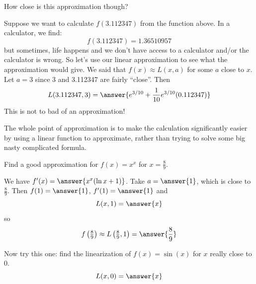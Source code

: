 \documentclass{ximera}
\begin{document}
How close is this approximation though?

\begin{example}\label{example:8-10}
Suppose we want to calculate $f(3.112347)$ from the function above. In a calculator, we find:
\[
f(3.112347)=1.36510957
\]
but sometimes, life happens and we don't have access to a calculator and/or the calculator is wrong. So let's use our linear approximation to see what the approximation would give. We said that $f(x) \approx L(x, a)$ for some $a$ close to $x$. Let $a=3$ since 3 and 3.112347 are fairly ``close''. Then
\[
L(3.112347,3)=\answer{e^{3/10}+\frac{1}{10}e^{3/10}(0.112347)}
\]
This is not to bad of an approximation!
\end{example}

The whole point of approximation is to make the calculation significantly easier by using a linear function to approximate, rather than trying to solve some big nasty complicated formula.

\begin{example}\label{example:8-11}
Find a good approximation for $f(x)=x^{x}$ for $x=\frac{8}{9}$.

We have $f^{\prime}(x)=\answer{x^{x}(\ln x+1)}$. Take $a=\answer{1}$, which is close to $\frac{8}{9}$. Then $f(1)=\answer{1}$, $f^{\prime}(1)=\answer{1}$ and
\[
L(x,1)=\answer{x}
\]
so
\[
f\left(\tfrac{8}{9}\right)\approx L\left(\tfrac{8}{9},1\right)=\answer{\frac{8}{9}}
\]
\end{example}

\begin{exercise}\label{exercise:8-12}
Now try this one: find the linearization of $f(x)=\sin (x)$ for $x$ really close to 0.
\[
L(x,0)=\answer{x}
\]
\end{exercise}
\end{document}

